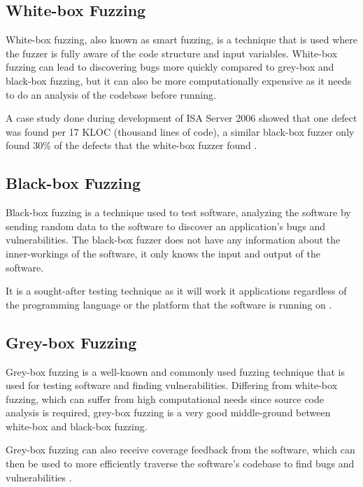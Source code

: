 \documentclass[a4paper,12pt]{article}
\begin{document}
\subsection{White-box Fuzzing}
White-box fuzzing, also known as smart fuzzing, is a technique that is used where the fuzzer is fully aware of the code structure and input variables. White-box fuzzing can lead to discovering bugs more quickly compared to grey-box and black-box fuzzing, but it can also be more computationally expensive as it needs to do an analysis of the codebase before running. 

A case study done during development of ISA Server 2006 showed that one defect was found per 17 KLOC (thousand lines of code), a similar black-box fuzzer only found 30\% of the defects that the white-box fuzzer found \cite{neystadt2009}.

\subsection{Black-box Fuzzing}
Black-box fuzzing is a technique used to test software, analyzing the software by sending random data to the software to discover an application's bugs and vulnerabilities. The black-box fuzzer does not have any information about the inner-workings of the software, it only knows the input and output of the software.


It is a sought-after testing technique as it will work it applications regardless of the programming language or the platform that the software is running on \cite{ALSAEDI202210068}.

\subsection{Grey-box Fuzzing}
Grey-box fuzzing is a well-known and commonly used fuzzing technique that is used for testing software and finding vulnerabilities. Differing from white-box fuzzing, which can suffer from high computational needs since source code analysis is required, grey-box fuzzing is a very good middle-ground between white-box and black-box fuzzing.\cite{8839290} 

Grey-box fuzzing can also receive coverage feedback from the software, which can then be used to more efficiently traverse the software's codebase to find bugs and vulnerabilities  \cite{Blackwell2024-ao}.

\newpage

\printbibliography
\end{document}
